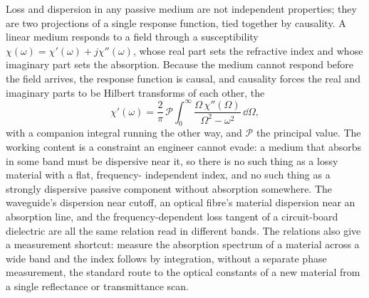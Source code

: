 \begin{mastery}
Loss and dispersion in any passive medium are not independent properties;
they are two projections of a single response function, tied together by
causality. A linear medium responds to a field through a susceptibility
$\chi(\omega) = \chi'(\omega) + j\chi''(\omega)$, whose real part sets the
refractive index and whose imaginary part sets the absorption. Because the
medium cannot respond before the field arrives, the response function is
causal, and causality forces the real and imaginary parts to be Hilbert
transforms of each other, the 
\[
\chi'(\omega) = \frac{2}{\pi}\,\mathcal{P}\!\int_0^{\infty}
\frac{\Omega\,\chi''(\Omega)}{\Omega^2 - \omega^2}\,\dd\Omega,
\]
with a companion integral running the other way, and $\mathcal{P}$ the
principal value. The working content is a constraint an engineer cannot
evade: a medium that absorbs in some band must be dispersive near it, so
there is no such thing as a lossy material with a flat, frequency-
independent index, and no such thing as a strongly dispersive passive
component without absorption somewhere. The waveguide's dispersion near
cutoff, an optical fibre's material dispersion near an absorption line, and
the frequency-dependent loss tangent of a circuit-board dielectric are all
the same relation read in different bands. The relations also give a
measurement shortcut: measure the absorption spectrum of a material across
a wide band and the index follows by integration, without a separate phase
measurement, the standard route to the optical constants of a new material
from a single reflectance or transmittance scan.
\end{mastery}

